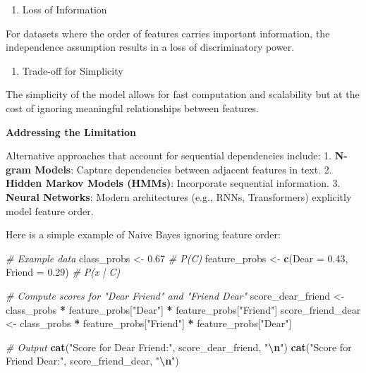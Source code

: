 \documentclass[
  12 pt,
  a4paper,
]{book}
\newenvironment{Shaded}{\begin{snugshade}}{\end{snugshade}}
\newcommand{\AttributeTok}[1]{\textcolor[rgb]{0.13,0.29,0.53}{#1}}
\newcommand{\CommentTok}[1]{\textcolor[rgb]{0.56,0.35,0.01}{\textit{#1}}}
\newcommand{\FloatTok}[1]{\textcolor[rgb]{0.00,0.00,0.81}{#1}}
\newcommand{\FunctionTok}[1]{\textcolor[rgb]{0.13,0.29,0.53}{\textbf{#1}}}
\newcommand{\NormalTok}[1]{#1}
\newcommand{\OtherTok}[1]{\textcolor[rgb]{0.56,0.35,0.01}{#1}}
\newcommand{\SpecialCharTok}[1]{\textcolor[rgb]{0.81,0.36,0.00}{\textbf{#1}}}
\newcommand{\StringTok}[1]{\textcolor[rgb]{0.31,0.60,0.02}{#1}}
\providecommand{\tightlist}{%
  \setlength{\itemsep}{0pt}\setlength{\parskip}{0pt}}
\numberwithin{equation}{section}
\theoremstyle{plain}      %
\theoremstyle{definition} %
\theoremstyle{remark}     %
\theoremstyle{note}         %
\begin{document}
\begin{enumerate}
\def\labelenumi{\arabic{enumi}.}
\setcounter{enumi}{1}
\tightlist
\item
  Loss of Information
\end{enumerate}

For datasets where the order of features carries important information,
the independence assumption results in a loss of discriminatory power.

\begin{enumerate}
\def\labelenumi{\arabic{enumi}.}
\setcounter{enumi}{2}
\tightlist
\item
  Trade-off for Simplicity
\end{enumerate}

The simplicity of the model allows for fast computation and scalability
but at the cost of ignoring meaningful relationships between features.

\textbf{Addressing the Limitation}

Alternative approaches that account for sequential dependencies include:
1. \textbf{N-gram Models}: Capture dependencies between adjacent
features in text. 2. \textbf{Hidden Markov Models (HMMs)}: Incorporate
sequential information. 3. \textbf{Neural Networks}: Modern
architectures (e.g., RNNs, Transformers) explicitly model feature order.

Here is a simple example of Naive Bayes ignoring feature order:

\scriptsize

\begin{Shaded}
\begin{Highlighting}[]
\CommentTok{\# Example data}
\NormalTok{class\_probs }\OtherTok{\textless{}{-}} \FloatTok{0.67}  \CommentTok{\# P(C)}
\NormalTok{feature\_probs }\OtherTok{\textless{}{-}} \FunctionTok{c}\NormalTok{(}\AttributeTok{Dear =} \FloatTok{0.43}\NormalTok{, }\AttributeTok{Friend =} \FloatTok{0.29}\NormalTok{)  }\CommentTok{\# P(x | C)}

\CommentTok{\# Compute scores for "Dear Friend" and "Friend Dear"}
\NormalTok{score\_dear\_friend }\OtherTok{\textless{}{-}}\NormalTok{ class\_probs }\SpecialCharTok{*}\NormalTok{ feature\_probs[}\StringTok{"Dear"}\NormalTok{] }\SpecialCharTok{*}\NormalTok{ feature\_probs[}\StringTok{"Friend"}\NormalTok{]}
\NormalTok{score\_friend\_dear }\OtherTok{\textless{}{-}}\NormalTok{ class\_probs }\SpecialCharTok{*}\NormalTok{ feature\_probs[}\StringTok{"Friend"}\NormalTok{] }\SpecialCharTok{*}\NormalTok{ feature\_probs[}\StringTok{"Dear"}\NormalTok{]}

\CommentTok{\# Output}
\FunctionTok{cat}\NormalTok{(}\StringTok{"Score for \textquotesingle{}Dear Friend\textquotesingle{}:"}\NormalTok{, score\_dear\_friend, }\StringTok{"}\SpecialCharTok{\textbackslash{}n}\StringTok{"}\NormalTok{)}
\FunctionTok{cat}\NormalTok{(}\StringTok{"Score for \textquotesingle{}Friend Dear\textquotesingle{}:"}\NormalTok{, score\_friend\_dear, }\StringTok{"}\SpecialCharTok{\textbackslash{}n}\StringTok{"}\NormalTok{)}
\end{Highlighting}
\end{Shaded}
\end{document}
